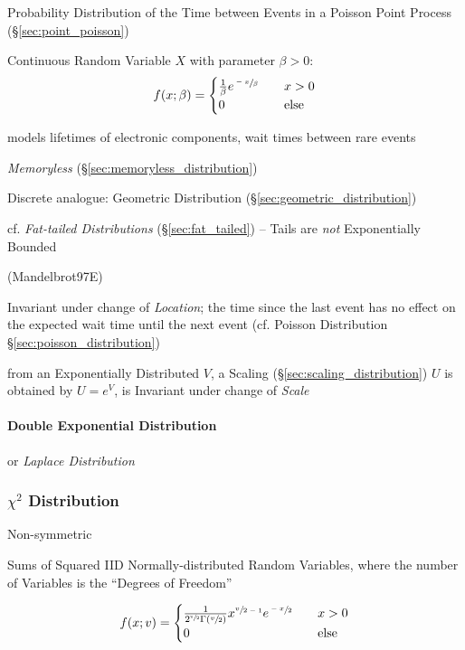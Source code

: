 Probability Distribution of the Time between Events in a Poisson Point Process
(\S\ref{sec:point_poisson})

Continuous Random Variable $X$ with parameter $\beta > 0$:
\[
  f(x; \beta) =
  \begin{cases}
  \frac{1}{\beta} e^{\sfrac{-x}{\beta}}     & \quad x > 0 \\
  0     & \quad\text{else} \\
  \end{cases}
\]

models lifetimes of electronic components, wait times between rare events

\emph{Memoryless} (\S\ref{sec:memoryless_distribution})

\fist Discrete analogue: Geometric Distribution
(\S\ref{sec:geometric_distribution})

cf. \emph{Fat-tailed Distributions} (\S\ref{sec:fat_tailed}) -- Tails are
\emph{not} Exponentially Bounded

(Mandelbrot97E)

Invariant under change of \emph{Location}; the time since the last event has no
effect on the expected wait time until the next event (cf. Poisson Distribution
\S\ref{sec:poisson_distribution})

from an Exponentially Distributed $V$, a Scaling
(\S\ref{sec:scaling_distribution}) $U$ is obtained by $U = e^V$, is Invariant
under change of \emph{Scale}



\paragraph{Double Exponential Distribution}\label{sec:double_exponential}\hfill

or \emph{Laplace Distribution}



\subsubsection{$\chi^2$ Distribution}\label{sec:chi_squared}

Non-symmetric

Sums of Squared IID Normally-distributed Random Variables, where the number of
Variables is the ``Degrees of Freedom''

\[
  f(x; v) =
  \begin{cases}
    \frac{1}{2^{\sfrac{v}{2}}\Gamma(\sfrac{v}{2})}
      x^{\sfrac{v}{2-1}} e^{\sfrac{-x}{2}}
          & \quad x > 0 \\
    0     & \quad\text{else} \\
  \end{cases}
\]

